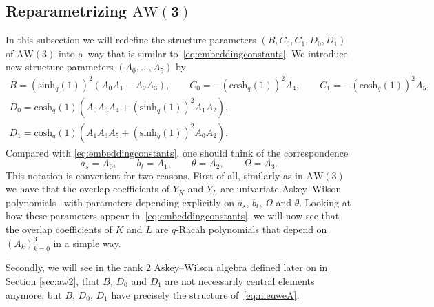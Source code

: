\documentclass[pdftex]{sigma}
\numberwithin{equation}{section}
\newcommand{\aw}{\mathrm{AW}\!\left(3\right)}
\newcommand{\bivariateawalgebra}{rank 2 Askey--Wilson algebra }
\newcommand{\chq}{\mathrm{cosh}_q}
\newcommand{\shq}{\mathrm{sinh}_q}
\begin{document}
\subsection[Reparametrizing AW(3)]{Reparametrizing $\boldsymbol{\aw}$}\label{sec:herdefAW}
In this subsection we will redefine the structure parameters $(B,C_0,C_1,D_0,D_1)$ of $\aw$ into a~way that is similar to~\eqref{eq:embeddingconstants}. We introduce new structure parameters $(A_0,\dots ,A_5)$ by
\begin{gather}
		B= (\shq(1))^2(A_0A_1 - A_2A_3),\qquad C_0=-(\chq(1))^2A_4,\qquad C_1=-(\chq(1))^2A_5,\nonumber\\
		D_0=\chq(1)(A_0A_3A_4+(\shq(1))^2A_1A_2), \nonumber\\
		D_1=\chq(1) (A_1A_3A_5+(\shq(1))^2A_0A_2).
\label{eq:nieuweA}
\end{gather}
Compared with \eqref{eq:embeddingconstants}, one should think of the correspondence
\[
a_s=A_0,\qquad b_t=A_1,\qquad \theta=A_2,\qquad \Omega=A_3.
\]
This notation is convenient for two reasons. First of all, similarly as in $\aw$ we have that the overlap coefficients of $Y_{K}$ and $Y_{L}$ are univariate Askey--Wilson polynomials~\cite{Groenevelt2021} with parameters depending explicitly on $a_s$, $b_t$, $\Omega$ and $\theta$. Looking at how these parameters appear in~\eqref{eq:embeddingconstants}, we will now see that the overlap coefficients of $K$ and $L$ are $q$-Racah polynomials that depend on $(A_k)_{k=0}^3$ in a simple way.

Secondly, we will see in the \bivariateawalgebra defined later on in Section \ref{sec:aw2}, that $B$, $D_0$ and $D_1$ are not necessarily central elements anymore, but $B$, $D_0$, $D_1$ have precisely the structure of~\eqref{eq:nieuweA}.
\end{document}
